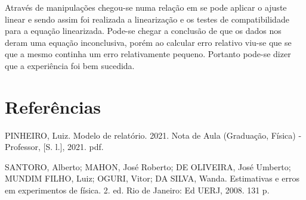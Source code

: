 \documentclass [a4paper, 12pt]{article}
\begin{document}
Através de manipulações chegou-se numa relação em se pode aplicar o ajuste linear e sendo assim foi realizada a linearização e os testes de compatibilidade para a equação linearizada. Pode-se chegar a conclusão de que os dados nos deram uma equação inconclusiva, porém ao calcular erro relativo viu-se que se que a mesmo continha um erro relativamente pequeno. Portanto pode-se dizer que a experiência foi bem sucedida.

\section{Referências}

PINHEIRO, Luiz. Modelo de relatório. 2021. Nota de Aula (Graduação, Física) - Professor, [S. l.], 2021. pdf.

SANTORO, Alberto; MAHON, José Roberto; DE OLIVEIRA, José Umberto; MUNDIM FILHO, Luiz; OGURI, Vitor; DA SILVA, Wanda. Estimativas e erros em experimentos de física. 2. ed. Rio de Janeiro: Ed UERJ, 2008. 131 p.
\end{document}
